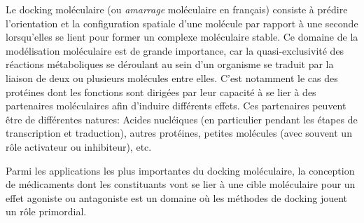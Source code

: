 Le docking moléculaire (ou \textit{amarrage} moléculaire en français) consiste à prédire l'orientation et la configuration spatiale d'une molécule par rapport à une seconde lorsqu’elles se lient pour former un complexe moléculaire stable. Ce domaine de la modélisation moléculaire est de grande importance, car la quasi-exclusivité des réactions métaboliques se déroulant au sein d'un organisme se traduit par la liaison de deux ou plusieurs molécules entre elles. C'est notamment le cas des protéines dont les fonctions sont dirigées par leur capacité à se lier à des partenaires moléculaires afin d'induire différents effets. Ces partenaires peuvent être de différentes natures: Acides nucléiques (en particulier pendant les étapes de transcription et traduction), autres protéines, petites molécules (avec souvent un rôle activateur ou inhibiteur), etc.

Parmi les applications les plus importantes du docking moléculaire, la conception de médicaments dont les constituants vont se lier à une cible moléculaire pour un effet agoniste ou antagoniste est un domaine où les méthodes de docking jouent un rôle primordial.

